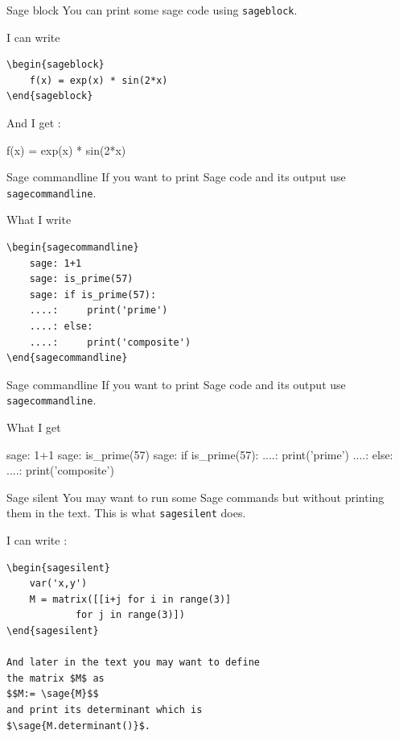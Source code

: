 \documentclass{beamer}
\begin{document}
	\begin{frame}[fragile]{Sage block}
	You can print some sage code using \texttt{sageblock}. \newline
	
	I can write
	\begin{Verbatim}[frame=single]
\begin{sageblock}
	f(x) = exp(x) * sin(2*x)
\end{sageblock}
	\end{Verbatim}
	
	And I get : 
	
	\begin{sageblock}
		f(x) = exp(x) * sin(2*x)
	\end{sageblock}
		
	\end{frame}
	\begin{frame}[fragile]{Sage commandline}
		If you want to print Sage code and its output use \texttt{sagecommandline}. \newline 
		
		What I write
		\begin{Verbatim}[frame=single]
\begin{sagecommandline}
	sage: 1+1
	sage: is_prime(57)
	sage: if is_prime(57):
	....:     print('prime')
	....: else:
	....:     print('composite')
\end{sagecommandline}
		\end{Verbatim}	
	
	\end{frame}
	\begin{frame}[fragile]{Sage commandline}
		If you want to print Sage code and its output use \texttt{sagecommandline}. \newline 
				
		What I get
		
		\begin{sagecommandline}
			sage: 1+1
			sage: is_prime(57)
			sage: if is_prime(57):
			....:     print('prime')
			....: else:
			....:     print('composite')
		\end{sagecommandline}	
		
		\end{frame}
	\begin{frame}[fragile]{Sage silent}
		You may want to run some Sage commands but without printing them in the text. This is what \texttt{sagesilent} does. \newline
		
		I can write : \newline
		
		\begin{Verbatim}[frame=single]
\begin{sagesilent}
	var('x,y')
	M = matrix([[i+j for i in range(3)] 
			for j in range(3)])
\end{sagesilent}

And later in the text you may want to define 
the matrix $M$ as 
$$M:= \sage{M}$$
and print its determinant which is 
$\sage{M.determinant()}$.
		\end{Verbatim}
	
	\end{frame}
\end{document}
